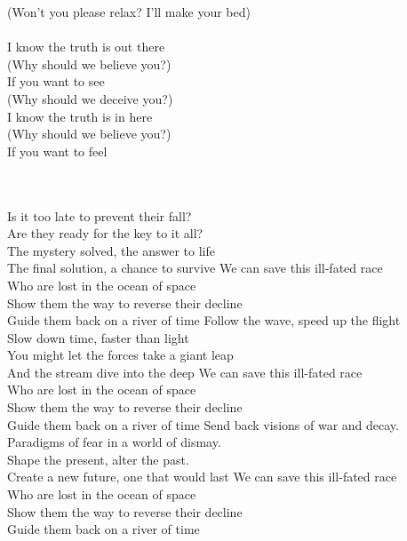 (Won't you please relax? I'll make your bed)\\
\hops
\tab{}\tab{}\\
 I know the truth is out there\\
 (Why should we believe you?)\\
 If you want to see\tab{}\\
 (Why should we deceive you?)\\
 I know the truth is in here\\
 (Why should we believe you?)\\
 If you want to feel\tab{}\\
\tab{}\\
\tab{}\\

\clearpage
{}

Is it too late to prevent their fall?\tab{}\\
Are they ready for the key to it all?\tab{}\\
The mystery solved, the answer to life\tab{}\\
The final solution, a chance to survive\tab{}
\hops
{} We can save this ill-fated race\tab{}\\
 Who are lost in the ocean of space\tab{}\\
 Show them the way to reverse their decline\\
 Guide them back on a river of time\tab{}
\hops
Follow the wave, speed up the flight\\
Slow down time, faster than light\\
You might let the forces take a giant leap\\
And the stream dive into the deep
\hops
{} We can save this ill-fated race\\
 Who are lost in the ocean of space\\
 Show them the way to reverse their decline\\
 Guide them back on a river of time
\hops
Send back visions of war and decay.\\
Paradigms of fear in a world of dismay.\\
Shape the present, alter the past.\\
Create a new future, one that would last
\hops
{} We can save this ill-fated race\\
 Who are lost in the ocean of space\\
 Show them the way to reverse their decline\\
 Guide them back on a river of time